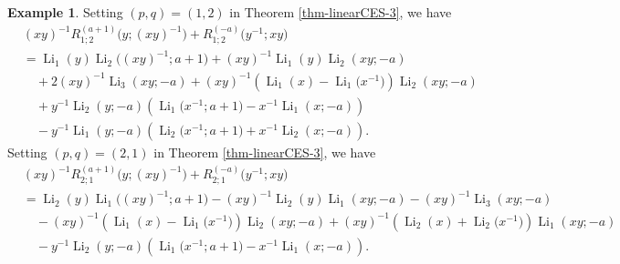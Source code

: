 \documentclass[11pt]{article}
\DeclareMathOperator{\Li}{Li}
\theoremstyle{plain}
\theoremstyle{definition}
\newtheorem{exa}[thm]{Example}
\begin{document}
\begin{exa}Setting $(p,q)=(1,2)$ in Theorem \ref{thm-linearCES-3}, we have
\begin{align*}
	&(xy)^{-1}R^{(a+1)}_{1;2}\Big(y;(xy)^{-1}\Big)+R_{1;2}^{(-a)}\Big(y^{-1};xy\Big)\nonumber\\
	&=\Li_1(y)\Li_2\Big((xy)^{-1};a+1\Big)+(xy)^{-1}\Li_1(y)\Li_2(xy;-a)\nonumber\\
	&\quad+2(xy)^{-1}\Li_{3}(xy;-a)+(xy)^{-1}\left(\Li_{1}(x)-\Li_{1}\Big(x^{-1}\Big)\right)\Li_{2}(xy;-a)\\
	&\quad+y^{-1}\Li_{2}(y;-a)\left(\Li_{1}\Big(x^{-1};a+1\Big)-x^{-1}\Li_{1}(x;-a)\right)\nonumber\\
	&\quad-y^{-1}\Li_{1}(y;-a)\left(\Li_{2}\Big(x^{-1};a+1\Big)+x^{-1}\Li_{2}(x;-a)\right).
	\end{align*}
	Setting $(p,q)=(2,1)$ in Theorem \ref{thm-linearCES-3}, we have
	\begin{align*}
		&(xy)^{-1}R^{(a+1)}_{2;1}\Big(y;(xy)^{-1}\Big)+R_{2;1}^{(-a)}\Big(y^{-1};xy\Big)\nonumber\\
		&=\Li_2(y)\Li_1\Big((xy)^{-1};a+1\Big)-(xy)^{-1}\Li_2(y)\Li_1(xy;-a)-(xy)^{-1}\Li_{3}(xy;-a)\nonumber\\
		&\quad-(xy)^{-1} \left(\Li_{1}(x)-\Li_{1}\Big(x^{-1}\Big)\right)\Li_{2}(xy;-a)+(xy)^{-1} \left(\Li_{2}(x)+\Li_{2}\Big(x^{-1}\Big)\right)\Li_{1}(xy;-a)\nonumber\\
		&\quad-y^{-1}\Li_{2}(y;-a)\left(\Li_{1}\Big(x^{-1};a+1\Big)-x^{-1}\Li_{1}(x;-a)\right).
	\end{align*}
\end{exa}
\end{document}
